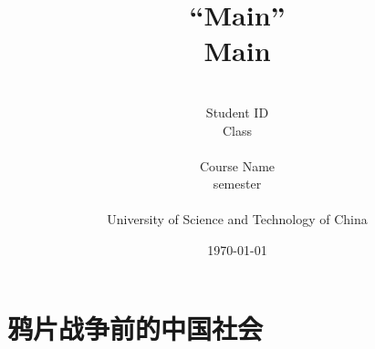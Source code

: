 \documentclass{ctexart}
\begin{document}
\title{{\Huge  “Main”{\large\linebreak\\}}{\Large Main\linebreak\linebreak}}
\author{\\Student ID\\
Class\\\\
Course Name\\
semester\\\\
University of Science and Technology of China
}
\date{\today}
\maketitle
\maketitle

\newpage
\section{鸦片战争前的中国社会}
\end{document}

